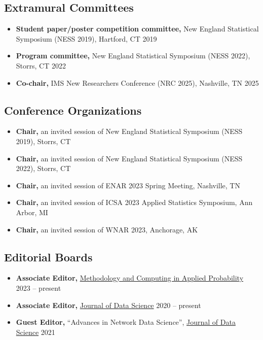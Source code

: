 \documentclass[12pt]{article}
\begin{document}
	\subsection*{Extramural Committees}
	\begin{itemize}
		\item {\bf Student paper/poster competition committee,} New 
		England Statistical Symposium (NESS 2019), Hartford, CT 
		\hfill 2019
		\item {\bf Program committee,} New England Statistical 
		Symposium (NESS 2022), Storrs, CT \hfill 2022
		\item {\bf Co-chair,} IMS New Researchers Conference (NRC 
		2025), Nashville, TN \hfill 2025
	\end{itemize}
	
	\subsection*{Conference Organizations}
	\begin{itemize}
		\item {\bf Chair,} an invited session of New England Statistical Symposium (NESS 2019), Storrs, CT
		\item {\bf Chair,} an invited session of New England Statistical Symposium (NESS 2022), Storrs, CT
		\item {\bf Chair,} an invited session of ENAR 2023 Spring Meeting, Nashville, TN
		\item {\bf Chair,} an invited session of ICSA 2023 Applied 
		Statistics Symposium, Ann Arbor, MI
		\item {\bf Chair,} an invited session of WNAR 2023, 
		Anchorage, AK
	\end{itemize}
	
	
	\subsection*{Editorial Boards}
	\begin{itemize}
		\item \textbf{Associate Editor,}
		\href{https://www.springer.com/journal/11009/}{Methodology 
		and Computing in Applied Probability} \hfill 2023 -- present
		\item \textbf{Associate Editor,} 
		\href{https://jds-online.org/journal/JDS}{Journal of Data Science} \hfill 2020 -- present
		\item \textbf{Guest Editor,} ``Advances in Network Data 
		Science'', \href{https://jds-online.org/journal/JDS}{Journal of Data Science} \hfill 2021
	\end{itemize}
\end{document}
